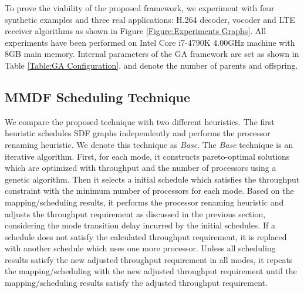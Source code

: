 \documentclass[prodmode,acmtecs]{acmsmall}
\begin{document}
To prove the viability of the proposed framework, we experiment with four synthetic examples and three real applications: H.264 decoder, vocoder \cite{Zhai:2015} and LTE receiver \cite{Siyoum:2011} algorithms as shown in Figure \ref{Figure:Experiments Graphs}. All experiments have been performed on Intel Core i7-4790K 4.00GHz machine with 8GB main memory. Internal parameters of the GA framework are set as shown in Table \ref{Table:GA Configuration}.  and  denote the number of parents and offspring.

\begin{table}[ht]
\centering
{}
\end{table}

\subsection{MMDF Scheduling Technique}
\label{SubSection:MMDF Scheduling Technique}

We compare the proposed technique with two different heuristics. The first heuristic schedules SDF graphs independently and performs the processor renaming heuristic. We denote this technique as \textit{Base}. The \textit{Base} technique is an iterative algorithm. First, for each mode, it constructs pareto-optimal solutions which are optimized with throughput and the number of processors using a genetic algorithm. Then it selects a initial schedule which satisfies the throughput constraint with the minimum number of processors for each mode. Based on the mapping/scheduling results, it performs the processor renaming heuristic and adjusts the throughput requirement as discussed in the previous section, considering the mode transition delay incurred by the initial schedules. If a schedule does not satisfy the calculated throughput requirement, it is replaced with another schedule which uses one more processor. Unless all scheduling results satisfy the new adjusted throughput requirement in all modes, it repeats the mapping/scheduling with the new adjusted throughput requirement until the mapping/scheduling results satisfy the adjusted throughput requirement.
\end{document}
